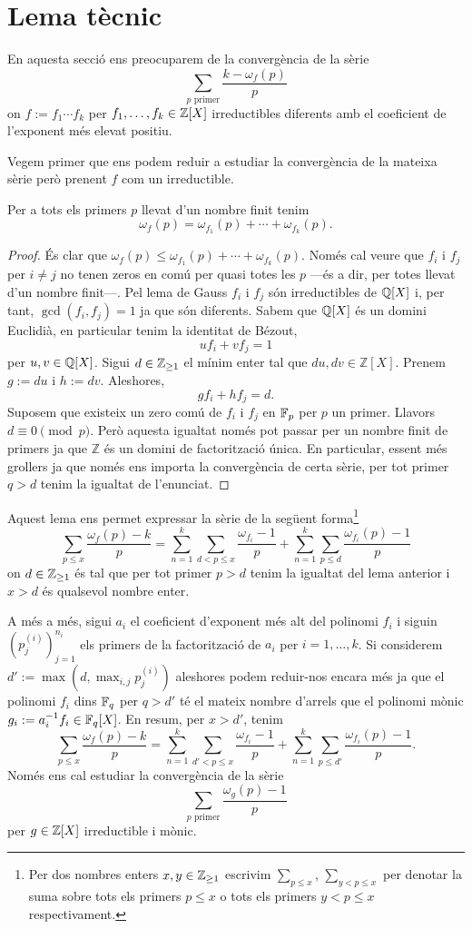 \section{Lema tècnic}
En aquesta secció ens preocuparem de la convergència de la sèrie
\[
\sum_{p\text{ primer}}\frac{k-\omega_f(p)}{p}
\]
on $f:=f_1\cdots f_k$ per $f_1,\ldots,f_k\in\mathbb{Z}[X]$ irreductibles diferents amb el coeficient de l'exponent més elevat positiu.

Vegem primer que ens podem reduir a estudiar la convergència de la mateixa sèrie però prenent $f$ com un irreductible.
\begin{lem}
    Per a tots els primers $p$ llevat d'un nombre finit tenim
    \[
    \omega_f(p)=\omega_{f_1}(p)+\cdots +\omega_{f_k}(p).
    \]
\end{lem}
\begin{proof}
    És clar que $\omega_f(p)\leq \omega_{f_1}(p)+\cdots +\omega_{f_k}(p)$. Només cal veure que $f_i$ i $f_j$ per $i\neq j$ no tenen zeros en comú per quasi totes les $p$ ---és a dir, per totes llevat d'un nombre finit---. Pel lema de Gauss $f_i$ i $f_j$ són irreductibles de $\mathbb{Q}[X]$ i, per tant, $\gcd(f_i,f_j)=1$ ja que són diferents. Sabem que $\mathbb{Q}[X]$ és un domini Euclidià, en particular tenim la identitat de Bézout,
    \[
    uf_i+vf_j=1
    \]
    per $u,v\in \mathbb{Q}[X]$. Sigui $d\in \mathbb{Z}_{\geq 1}$ el mínim enter tal que $du, dv\in\mathbb Z[X]$. Prenem $g:=du$ i $h:=dv$. Aleshores,
    \[
    gf_i+hf_j=d.
    \]
    Suposem que existeix un zero comú de $f_i$ i $f_j$ en $\mathbb{F}_p$ per $p$ un primer. Llavors $d\equiv 0\pmod{p}$. Però aquesta igualtat només pot passar per un nombre finit de primers ja que $\mathbb Z$ és un domini de factorització única. En particular, essent més grollers ja que només ens importa la convergència de certa sèrie, per tot primer $q>d$ tenim la igualtat de l'enunciat.
\end{proof}

Aquest lema ens permet expressar la sèrie de la següent forma\footnote{Per dos nombres enters $x,y\in\mathbb{Z}_{\geq 1}$ escrivim $\sum_{p\leq x}$, $\sum_{y<p\leq x}$ per denotar la suma sobre tots els primers $p\leq x$ o tots els primers $y<p\leq x$ respectivament.}
\[
\sum_{p\leq x}\frac{\omega_f(p)-k}{p}=\sum_{n=1}^k\sum_{d<p\leq x}\frac{\omega_{f_i}-1}{p}+\sum_{n=1}^k\sum_{p\leq d}\frac{\omega_{f_i}(p)-1}{p}
\]
on $d\in\mathbb{Z}_{\geq 1}$ és tal que per tot primer $p>d$ tenim la igualtat del lema anterior i $x>d$ és qualsevol nombre enter.

A més a més, sigui $a_i$ el coeficient d'exponent més alt del polinomi $f_i$ i siguin $(p_j^{(i)})_{j=1}^{n_i}$ els primers de la factorització de $a_i$ per $i=1,\ldots, k$. Si considerem $d':=\max(d, \max_{i,j}p_j^{(i)})$ aleshores podem reduir-nos encara més ja que el polinomi $f_i$ dins $\mathbb{F}_q$ per $q> d'$ té el mateix nombre d'arrels que el polinomi mònic $g_i:=a_i^{-1}f_i\in\mathbb{F}_q[X]$. En resum, per $x>d'$, tenim
\[
\sum_{p\leq x}\frac{\omega_f(p)-k}{p}=\sum_{n=1}^k\sum_{d'<p\leq x}\frac{\omega_{f_i}-1}{p}+\sum_{n=1}^k\sum_{p\leq d'}\frac{\omega_{f_i}(p)-1}{p}.
\]
Només ens cal estudiar la convergència de la sèrie 
\[
\sum_{p\text{ primer}}\frac{\omega_g(p)-1}{p}
\]
per $g\in\mathbb{Z}[X]$ irreductible i mònic.


